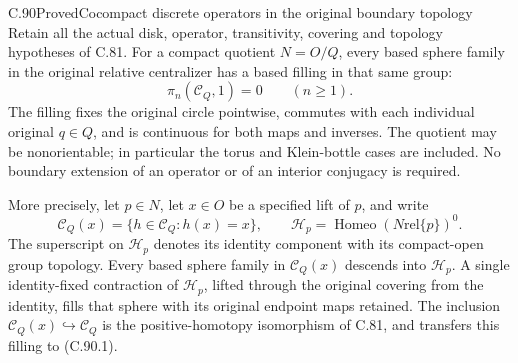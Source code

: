 \begin{claim}{C.90}{Proved}{Cocompact discrete operators in the original boundary topology}
Retain all the actual disk, operator, transitivity,
covering and topology hypotheses of C.81.
For a compact quotient $N=O/Q$, every based
sphere family in the original relative centralizer
has a based filling in that same group:
\[
          \pi_n(\mathscr C_Q,1)=0\qquad(n\geq1).
                                                               \tag{C.90.1}
\]
The filling fixes the original circle pointwise,
commutes with each individual original $q\in Q$,
and is continuous for both maps and inverses.
The quotient may be nonorientable; in particular
the torus and Klein-bottle cases are included.
No boundary extension of an operator or of an
interior conjugacy is required.

More precisely, let $p\in N$, let $x\in O$
be a specified lift of $p$, and write
\[
 \mathscr C_Q(x)=\{h\in\mathscr C_Q:h(x)=x\},\qquad
 \mathscr H_p=\operatorname{Homeo}(N\mathbin{\mathrm{rel}}\{p\})^0.
                                                               \tag{C.90.2}
\]
The superscript on $\mathscr H_p$ denotes its
identity component with its compact-open group
topology. Every based sphere family in
$\mathscr C_Q(x)$ descends into $\mathscr H_p$.
A single identity-fixed contraction of
$\mathscr H_p$, lifted through the original
covering from the identity, fills that sphere
with its original endpoint maps retained.
The inclusion $\mathscr C_Q(x)\hookrightarrow
\mathscr C_Q$ is the positive-homotopy
isomorphism of C.81, and transfers this filling
to (C.90.1).
\end{claim}

